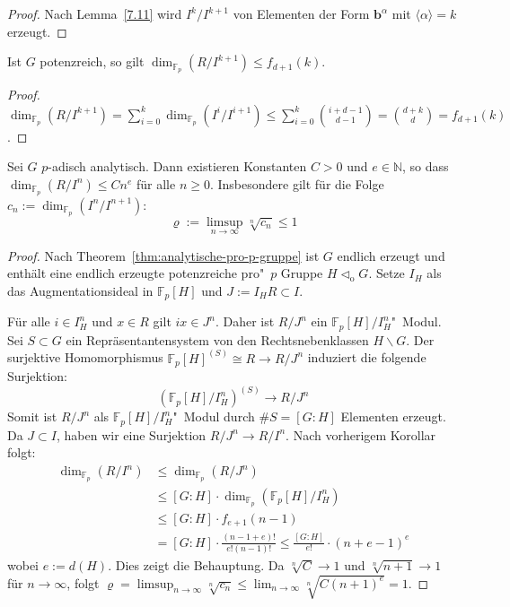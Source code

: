 \documentclass[11pt,a4paper,openany]{memoir}
\begin{document}
\begin{proof}
Nach Lemma~\ref{7.11} wird $I^k/I^{k+1}$ von Elementen der Form $\mathbf{b}^\alpha$ mit $\langle\alpha\rangle =k$ erzeugt.
\end{proof}

\begin{corollary}
Ist $G$ potenzreich, so gilt $\dim_{\mathbb{F}_p}(R/I^{k+1})\leq f_{d+1}(k)$.
\end{corollary}

\begin{proof}
$\dim_{\mathbb{F}_p}(R/I^{k+1})=\sum_{i=0}^k\dim_{\mathbb{F}_p}(I^i/I^{i+1})\leq \sum_{i=0}^k\binom{i+d-1}{d-1}=\binom{d+k}{d}= f_{d+1}(k)$.
\end{proof}

\begin{proposition}\label{Ex7.5}
Sei $G$ $p$-adisch analytisch. Dann existieren Konstanten $C>0$ und $e\in\mathbb{N}$, so dass $\dim_{\mathbb{F}_p}(R/I^n)\leq Cn^e$ für alle $n\geq 0$. Insbesondere gilt für die Folge $c_n:=\dim_{\mathbb{F}_p}(I^n/I^{n+1})$:
\[\varrho:= \limsup_{n\to\infty}\sqrt[n]{c_n}\leq 1 \]
\end{proposition}

\begin{proof}
Nach Theorem~\ref{thm:analytische-pro-p-gruppe} ist $G$ endlich erzeugt und enthält eine endlich erzeugte potenzreiche pro"~$p$ Gruppe $H\lhd_\text{o}G$. Setze $I_H$ als das Augmentationsideal in $\mathbb{F}_p[H]$ und $J:=I_HR\subset I$. 

Für alle $i\in I_H^n$ und $x\in R$ gilt $ix\in J^n$. Daher ist $R/J^n$ ein $\mathbb{F}_p[H]/I_H^n$"~Modul. Sei $S\subset G$ ein Repräsentantensystem von den Rechtsnebenklassen $H\backslash G$. Der surjektive Homomorphismus $\mathbb{F}_p[H]^{(S)}\cong R\to R/J^n$ induziert die folgende Surjektion:
\[(\mathbb{F}_p[H]/I_H^n)^{(S)}\to R/J^n\]
Somit ist $R/J^n$ als $\mathbb{F}_p[H]/I_H^n$"~Modul durch $\#S=[G:H]$ Elementen erzeugt. Da $J\subset I$, haben wir eine Surjektion $R/J^n\to R/I^n$. Nach vorherigem Korollar folgt:
\begin{align*}
\dim_{\mathbb{F}_p}(R/I^n)&\leq\dim_{\mathbb{F}_p}(R/J^n)\\
&\leq [G:H]\cdot\dim_{\mathbb{F}_p}(\mathbb{F}_p[H]/I_H^n)\\
&\leq [G:H]\cdot f_{e+1}(n-1)\\
&= [G:H]\cdot \frac{(n-1+e)!}{e! (n-1)!}\leq \frac{[G:H]}{e!}\cdot (n+e-1)^e
\end{align*}
wobei $e:=d(H)$. Dies zeigt die Behauptung. Da $\sqrt[n]{C}\to 1$ und $\sqrt[n]{n+1}\to 1$ für $n\to\infty$, folgt $\varrho=\limsup_{n\to\infty}\sqrt[n]{c_n} \leq \lim_{n\to\infty}\sqrt[n]{C(n+1)^e}=1$.
\end{proof}
\end{document}
